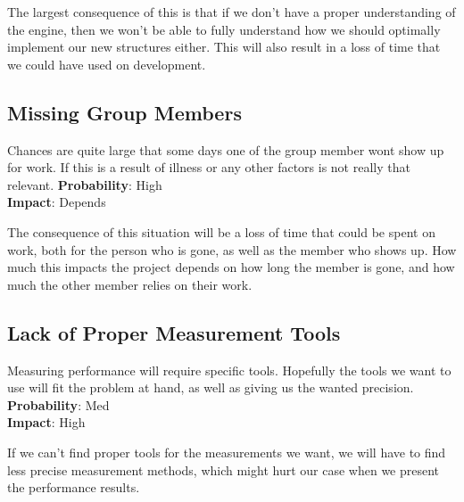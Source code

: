 The largest consequence of this is that if we don't have a proper understanding of the engine,
then we won't be able to fully understand how we should optimally implement our new structures either.
This will also result in a loss of time that we could have used on development.

\subsection*{Missing Group Members}
Chances are quite large that some days one of the group member wont show up for work.
If this is a result of illness or any other factors is not really that relevant.
\textbf{Probability}: High\\
\textbf{Impact}: Depends

The consequence of this situation will be a loss of time that could be spent on work, 
both for the person who is gone, as well as the member who shows up.
How much this impacts the project depends on how long the member is gone,
and how much the other member relies on their work.

\subsection*{Lack of Proper Measurement Tools}
Measuring performance will require specific tools. 
Hopefully the tools we want to use will fit the problem at hand, 
as well as giving us the wanted precision.
\textbf{Probability}: Med\\
\textbf{Impact}: High

If we can't find proper tools for the measurements we want,
we will have to find less precise measurement methods,
which might hurt our case when we present the performance results.